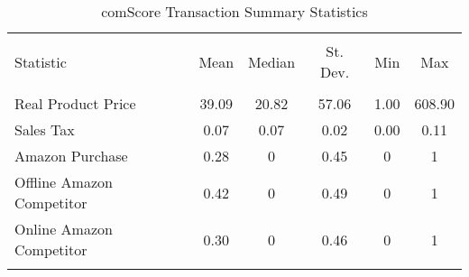 
\begin{table}[!htbp] \centering 
  \caption{comScore Transaction Summary Statistics} 
  \label{tab:comScoreSummary} 
\begin{tabular}{@{\extracolsep{5pt}}lccccc} 
\\[-1.8ex]\hline 
\hline \\[-1.8ex] 
Statistic & \multicolumn{1}{c}{Mean} & \multicolumn{1}{c}{Median} & \multicolumn{1}{c}{St. Dev.} & \multicolumn{1}{c}{Min} & \multicolumn{1}{c}{Max} \\ 
\hline \\[-1.8ex] 
Real Product Price & 39.09 & 20.82 & 57.06 & 1.00 & 608.90 \\ 
Sales Tax & 0.07 & 0.07 & 0.02 & 0.00 & 0.11 \\ 
Amazon Purchase & 0.28 & 0 & 0.45 & 0 & 1 \\ 
Offline Amazon Competitor & 0.42 & 0 & 0.49 & 0 & 1 \\ 
Online Amazon Competitor & 0.30 & 0 & 0.46 & 0 & 1 \\ 
\hline \\[-1.8ex] 
\end{tabular} 
\end{table} 
